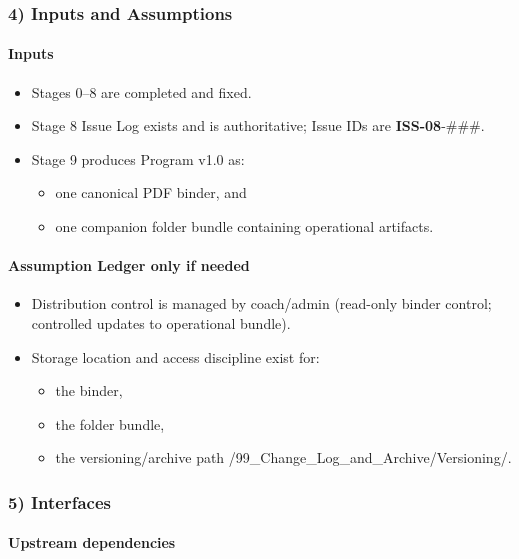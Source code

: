 \documentclass[10pt]{article}
\begin{document}
\subsubsection*{4) Inputs and Assumptions}

\paragraph*{Inputs}

\begin{itemize}
\item Stages 0–8 are completed and fixed.
\item Stage 8 Issue Log exists and is authoritative; Issue IDs are \textbf{ISS-08}-\#\#\#.
\item Stage 9 produces Program v1.0 as:
  \begin{itemize}
  \item one canonical PDF binder, and
  \item one companion folder bundle containing operational artifacts.
  \end{itemize}
\end{itemize}

\paragraph*{Assumption Ledger only if needed}

\begin{itemize}
\item Distribution control is managed by coach/admin (read-only binder control; controlled updates to operational bundle).
\item Storage location and access discipline exist for:
  \begin{itemize}
  \item the binder,
  \item the folder bundle,
  \item the versioning/archive path /99\_Change\_Log\_and\_Archive/Versioning/.
  \end{itemize}
\end{itemize}

\subsubsection*{5) Interfaces}

\paragraph*{Upstream dependencies}
\end{document}

